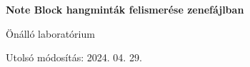 
\begin{titlepage}
    \begin{center}
        \vspace*{1cm}
            
        \Huge
        \textbf{Note Block hangminták felismerése zenefájlban}
            
        \vspace{0.5cm}
        \LARGE
        Önálló laboratórium
            
        \vspace{2.5cm}
            
            
        \vfill
            
            
        \vspace{0.8cm}
            
            
        \Large
        Utolsó módosítás: 2024. 04. 29.
        \vspace*{1cm}
            
    \end{center}
\end{titlepage}
